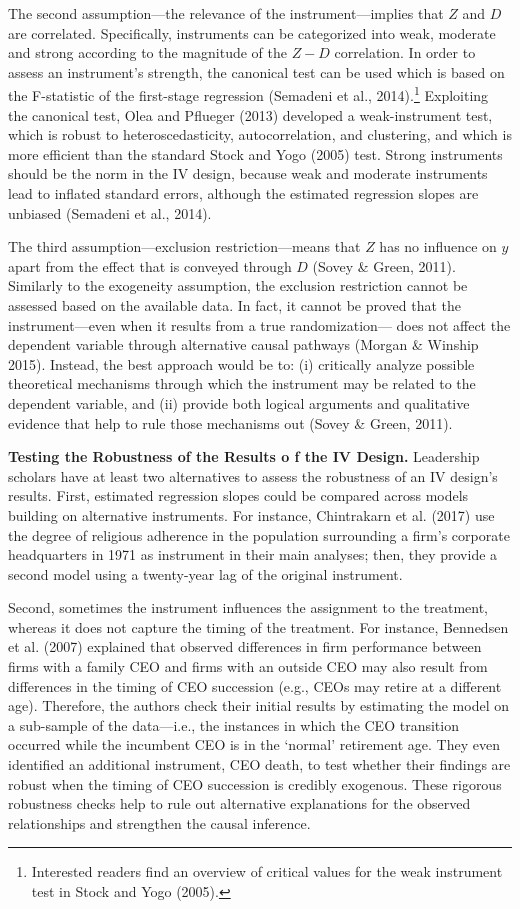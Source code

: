 \documentclass[english]{article}
\begin{document}
The second assumption---the relevance of the instrument---implies that
\(Z\) and \(D\) are correlated. Specifically, instruments can be
categorized into weak, moderate and strong according to the magnitude of
the \(Z - D\) correlation. In order to assess an instrument's strength,
the canonical test can be used which is based on the F-statistic of the
first-stage regression (Semadeni et al., 2014).\footnote{Interested
  readers find an overview of critical values for the weak instrument
  test in Stock and Yogo (2005).} Exploiting the canonical test, Olea
and Pflueger (2013) developed a weak-instrument test, which is robust to
heteroscedasticity, autocorrelation, and clustering, and which is more
efficient than the standard Stock and Yogo (2005) test. Strong
instruments should be the norm in the IV design, because weak and
moderate instruments lead to inflated standard errors, although the
estimated regression slopes are unbiased (Semadeni et al., 2014).

The third assumption---exclusion restriction---means that \(Z\) has no
influence on \(y\) apart from the effect that is conveyed through \(D\)
(Sovey \& Green, 2011). Similarly to the exogeneity assumption, the
exclusion restriction cannot be assessed based on the available data. In
fact, it cannot be proved that the instrument---even when it results
from a true randomization--- does not affect the dependent variable
through alternative causal pathways (Morgan \& Winship 2015). Instead,
the best approach would be to: (i) critically analyze possible
theoretical mechanisms through which the instrument may be related to
the dependent variable, and (ii) provide both logical arguments and
qualitative evidence that help to rule those mechanisms out (Sovey \&
Green, 2011).

\noindent \textbf{Testing the Robustness of the Results o f the IV Design.}
Leadership scholars have at least two alternatives to assess the robustness of
an IV design's results. First, estimated regression slopes could be compared
across models building on alternative instruments. For instance, Chintrakarn
et al.  (2017) use the degree of religious adherence in the population
surrounding a firm's corporate headquarters in 1971 as instrument in their main
analyses; then, they provide a second model using a twenty-year lag of the
original instrument.

Second, sometimes the instrument influences the assignment to the treatment,
whereas it does not capture the timing of the treatment. For instance,
Bennedsen et al. (2007) explained that observed differences in firm performance
between firms with a family CEO and firms with an outside CEO may also result
from differences in the timing of CEO succession (e.g., CEOs may retire at a
different age). Therefore, the authors check their initial results by
estimating the model on a sub-sample of the data---i.e., the instances in which
the CEO transition occurred while the incumbent CEO is in the `normal'
retirement age. They even identified an additional instrument, CEO death, to
test whether their findings are robust when the timing of CEO succession is
credibly exogenous.  These rigorous robustness checks help to rule out
alternative explanations for the observed relationships and strengthen the
causal inference.
\end{document}
